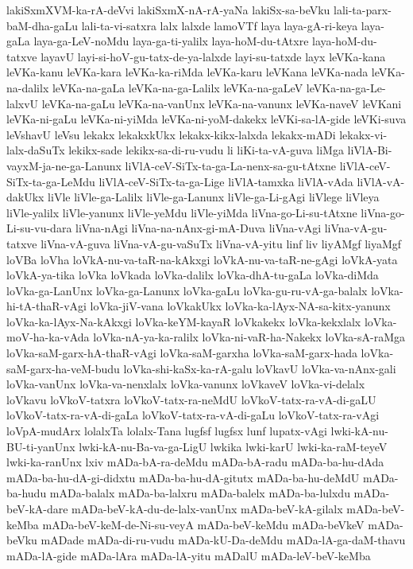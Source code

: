 {lakiSxmXVM-ka-rA-deVvi
lakiSxmX-nA-rA-yaNa
lakiSx-sa-beVku
lali-ta-parx-baM-dha-gaLu
lali-ta-vi-satxra
lalx
lalxde
lamoVTf
laya
laya-gA-ri-keya
laya-gaLa
laya-ga-LeV-noMdu
laya-ga-ti-yalilx
laya-hoM-du-tAtxre
laya-hoM-du-tatxve
layavU
layi-si-hoV-gu-tatx-de-ya-lalxde
layi-su-tatxde
layx
leVKa-kana
leVKa-kanu
leVKa-kara
leVKa-ka-riMda
leVKa-karu
leVKana
leVKa-nada
leVKa-na-dalilx
leVKa-na-gaLa
leVKa-na-ga-Lalilx
leVKa-na-gaLeV
leVKa-na-ga-Le-lalxvU
leVKa-na-gaLu
leVKa-na-vanUnx
leVKa-na-vanunx
leVKa-naveV
leVKani
leVKa-ni-gaLu
leVKa-ni-yiMda
leVKa-ni-yoM-dakekx
leVKi-sa-lA-gide
leVKi-suva
leVshavU
leVsu
lekakx
lekakxkUkx
lekakx-kikx-lalxda
lekakx-mADi
lekakx-vi-lalx-daSuTx
lekikx-sade
lekikx-sa-di-ru-vudu
li
liKi-ta-vA-guva
liMga
liVlA-Bi-vayxM-ja-ne-ga-Lanunx
liVlA-ceV-SiTx-ta-ga-La-nenx-sa-gu-tAtxne
liVlA-ceV-SiTx-ta-ga-LeMdu
liVlA-ceV-SiTx-ta-ga-Lige
liVlA-tamxka
liVlA-vAda
liVlA-vA-dakUkx
liVle
liVle-ga-Lalilx
liVle-ga-Lanunx
liVle-ga-Li-gAgi
liVlege
liVleya
liVle-yalilx
liVle-yanunx
liVle-yeMdu
liVle-yiMda
liVna-go-Li-su-tAtxne
liVna-go-Li-su-vu-dara
liVna-nAgi
liVna-na-nAnx-gi-mA-Duva
liVna-vAgi
liVna-vA-gu-tatxve
liVna-vA-guva
liVna-vA-gu-vaSuTx
liVna-vA-yitu
linf
liv
liyAMgf
liyaMgf
loVBa
loVha
loVkA-nu-va-taR-na-kAkxgi
loVkA-nu-va-taR-ne-gAgi
loVkA-yata
loVkA-ya-tika
loVka
loVkada
loVka-dalilx
loVka-dhA-tu-gaLa
loVka-diMda
loVka-ga-LanUnx
loVka-ga-Lanunx
loVka-gaLu
loVka-gu-ru-vA-ga-balalx
loVka-hi-tA-thaR-vAgi
loVka-jiV-vana
loVkakUkx
loVka-ka-lAyx-NA-sa-kitx-yanunx
loVka-ka-lAyx-Na-kAkxgi
loVka-keYM-kayaR
loVkakekx
loVka-kekxlalx
loVka-moV-ha-ka-vAda
loVka-nA-ya-ka-ralilx
loVka-ni-vaR-ha-Nakekx
loVka-sA-raMga
loVka-saM-garx-hA-thaR-vAgi
loVka-saM-garxha
loVka-saM-garx-hada
loVka-saM-garx-ha-veM-budu
loVka-shi-kaSx-ka-rA-galu
loVkavU
loVka-va-nAnx-gali
loVka-vanUnx
loVka-va-nenxlalx
loVka-vanunx
loVkaveV
loVka-vi-delalx
loVkavu
loVkoV-tatxra
loVkoV-tatx-ra-neMdU
loVkoV-tatx-ra-vA-di-gaLU
loVkoV-tatx-ra-vA-di-gaLa
loVkoV-tatx-ra-vA-di-gaLu
loVkoV-tatx-ra-vAgi
loVpA-mudArx
lolalxTa
lolalx-Tana
lugfsf
lugfsx
lunf
lupatx-vAgi
lwki-kA-nu-BU-ti-yanUnx
lwki-kA-nu-Ba-va-ga-LigU
lwkika
lwki-karU
lwki-ka-raM-teyeV
lwki-ka-ranUnx
lxiv
mADa-bA-ra-deMdu
mADa-bA-radu
mADa-ba-hu-dAda
mADa-ba-hu-dA-gi-didxtu
mADa-ba-hu-dA-gitutx
mADa-ba-hu-deMdU
mADa-ba-hudu
mADa-balalx
mADa-ba-lalxru
mADa-balelx
mADa-ba-lulxdu
mADa-beV-kA-dare
mADa-beV-kA-du-de-lalx-vanUnx
mADa-beV-kA-gilalx
mADa-beV-keMba
mADa-beV-keM-de-Ni-su-veyA
mADa-beV-keMdu
mADa-beVkeV
mADa-beVku
mADade
mADa-di-ru-vudu
mADa-kU-Da-deMdu
mADa-lA-ga-daM-thavu
mADa-lA-gide
mADa-lAra
mADa-lA-yitu
mADalU
mADa-leV-beV-keMba
}
